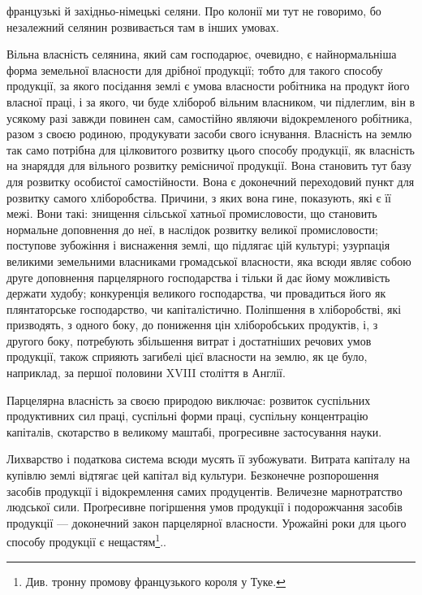 \parcont{}  %
французькі й західньо-німецькі селяни. Про колонії ми тут не говоримо, бо
незалежний селянин розвивається там в інших умовах.

Вільна власність селянина, який сам господарює, очевидно, є найнормальніша
форма земельної власности для дрібної продукції; тобто для такого способу
продукції, за якого посідання землі є умова власности робітника на продукт
його власної праці, і за якого, чи буде хлібороб вільним власником, чи підлеглим,
він в усякому разі завжди повинен сам, самостійно являючи відокремленого
робітника, разом з своєю родиною, продукувати засоби свого існування. Власність
на землю так само потрібна для цілковитого розвитку цього способу продукції,
як власність на знаряддя для вільного розвитку ремісничої продукції. Вона
становить тут базу для розвитку особистої самостійности. Вона є доконечний
переходовий пункт для розвитку самого хліборобства. Причини, з яких вона
гине, показують, які є її межі. Вони такі: знищення сільської хатньої промисловости,
що становить нормальне доповнення до неї, в наслідок розвитку
великої промисловости; поступове зубожіння і виснаження землі, що підлягає
цій культурі; узурпація великими земельними власниками громадської власности,
яка всюди являє собою друге доповнення парцелярного господарства і
тільки й дає йому можливість держати худобу; конкуренція великого господарства,
чи провадиться його як плянтаторське господарство, чи капіталістично.
Поліпшення в хліборобстві, які призводять, з одного боку, до пониження цін
хліборобських продуктів, і, з другого боку, потребують збільшення витрат і
достатніших речових умов продукції, також сприяють загибелі цієї власности
на землю, як це було, наприклад, за першої половини XVIII століття в Англії.

Парцелярна власність за своєю природою виключає: розвиток суспільних
продуктивних сил праці, суспільні форми праці, суспільну концентрацію капіталів,
скотарство в великому маштабі, прогресивне застосування науки.

Лихварство і податкова система всюди мусять її зубожувати. Витрата капіталу
на купівлю землі відтягає цей капітал від культури. Безконечне розпорошення
засобів продукції і відокремлення самих продуцентів. Величезне марнотратство
людської сили. Проґресивне погіршення умов продукції і подорожчання
засобів продукції — доконечний закон парцелярної власности. Урожайні роки для
цього способу продукції є нещастям\footnote{
Див. тронну промову французького короля у Туке.
}..

